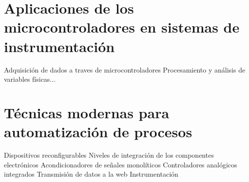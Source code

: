 \documentclass[11pt]{report}
\theoremstyle{plain}
\theoremstyle{definition}
\begin{document}
\chapter{Aplicaciones de los microcontroladores en sistemas de instrumentación}

Adquisición de dados a traves de microcontroladores
Procesamiento y análisis de variables físicas...



\chapter{Técnicas modernas para automatización de procesos}
Dispositivos reconfigurables
Niveles de integración de los componentes electrónicos
Acondicionadores de señales monolíticos
Controladores analógicos integrados
Transmisión de datos a la web
Instrumentación





\end{document}
